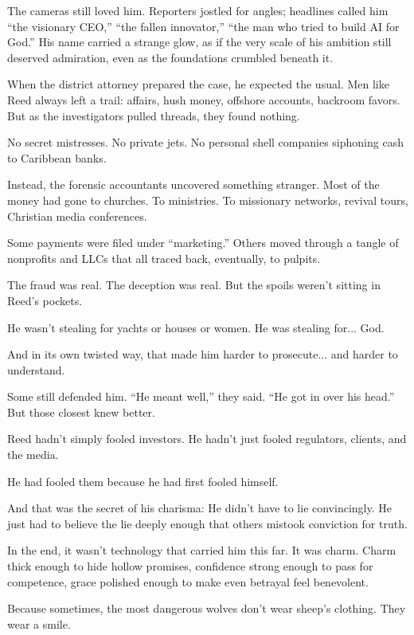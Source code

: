 The cameras still loved him.  
Reporters jostled for angles; headlines called him “the visionary CEO,” “the fallen innovator,” “the man who tried to build AI for God.” His name carried a strange glow, as if the very scale of his ambition still deserved admiration, even as the foundations crumbled beneath it.

When the district attorney prepared the case, he expected the usual.  
Men like Reed always left a trail: affairs, hush money, offshore accounts, backroom favors.  
But as the investigators pulled threads, they found nothing.  

No secret mistresses.  
No private jets.  
No personal shell companies siphoning cash to Caribbean banks.  

Instead, the forensic accountants uncovered something stranger.  
Most of the money had gone to churches.  
To ministries.  
To missionary networks, revival tours, Christian media conferences.  

Some payments were filed under “marketing.”  
Others moved through a tangle of nonprofits and LLCs that all traced back, eventually, to pulpits.  

The fraud was real.  
The deception was real.  
But the spoils weren’t sitting in Reed’s pockets.  

He wasn’t stealing for yachts or houses or women.  
He was stealing for... God.

And in its own twisted way,  
that made him harder to prosecute...  
and harder to understand.

Some still defended him. “He meant well,” they said. “He got in over his head.”  
But those closest knew better.

Reed hadn’t simply fooled investors.  
He hadn’t just fooled regulators, clients, and the media.

He had fooled them because he had first fooled himself.

And that was the secret of his charisma:  
He didn’t have to lie convincingly.  
He just had to believe the lie deeply enough that others mistook conviction for truth.

In the end, it wasn’t technology that carried him this far.  
It was charm.  
Charm thick enough to hide hollow promises, confidence strong enough to pass for competence, grace polished enough to make even betrayal feel benevolent.

Because sometimes, the most dangerous wolves don’t wear sheep’s clothing.  
They wear a smile.


\medskip

